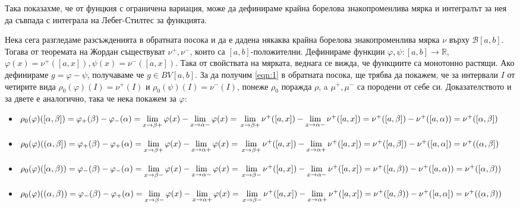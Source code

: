 \documentclass[bulgarian, 12pt]{article}
\begin{document}
Така показахме, че от фунцкия с ограничена вариация, може да дефинираме крайна борелова знакопроменлива мярка и интегралът за нея да съвпада с интеграла на Лебег-Стилтес за функцията. \par
Нека сега разгледаме разсъжденията в обратната посока и да е дадена някаква крайна борелова знакопроменлива мярка $\nu$ върху $\mathcal{B}[a, b]$. Тогава от теоремата на Жордан съществуват $\nu^+, \nu^-$, които са $[a,b]$-положителни. Дефинираме функции $\varphi, \psi : [a, b] \to \mathbb{R}$, $\varphi(x) = \nu^+([a,x]), \psi(x) = \nu^-([a,x])$. Така от свойствата на мярката, веднага се вижда, че функциите са монотонно растящи. Ако дефинираме $g = \varphi - \psi$, получаваме че $g \in BV[a,b]$. За да получим \eqref{eqn:1} в обратната посока, ще трябва да покажем, че за интервали $I$ от четирите вида $\rho_0(\varphi)(I) = \nu^+(I)$ и $\rho_0(\psi)(I) = \nu^-(I)$, понеже $\rho_0$ поражда $\rho$, a $\mu^+, \mu^-$ са породени от себе си. Доказателството и за двете е аналогично, така че нека покажем за $\varphi$:
\begin{itemize}
  \item $\rho_0(\varphi)([\alpha, \beta]) =
    \varphi_+(\beta) - \varphi_-(\alpha) =
    \lim\limits_{x \to \beta+}\varphi(x) - \lim\limits_{x \to \alpha-}\varphi(x) = \\
    \lim\limits_{x \to \beta+}\nu^+([a,x]) - \lim\limits_{x \to \alpha-}\nu^+([a,x]) =
    \nu^+([a, \beta]) - \nu^+([a, \alpha)) =
    \nu^+([\alpha, \beta])$
  \item $\rho_0(\varphi)((\alpha, \beta]) =
    \varphi_+(\beta) - \varphi_+(\alpha) =
    \lim\limits_{x \to \beta+}\varphi(x) - \lim\limits_{x \to \alpha+}\varphi(x) = \\
    \lim\limits_{x \to \beta+}\nu^+([a,x]) - \lim\limits_{x \to \alpha+}\nu^+([a,x]) =
    \nu^+([a, \beta]) - \nu^+([a, \alpha]) =
    \nu^+((\alpha, \beta])$
  \item $\rho_0(\varphi)([\alpha, \beta)) =
    \varphi_-(\beta) - \varphi_-(\alpha) =
    \lim\limits_{x \to \beta-}\varphi(x) - \lim\limits_{x \to \alpha-}\varphi(x) = \\
    \lim\limits_{x \to \beta-}\nu^+([a,x]) - \lim\limits_{x \to \alpha-}\nu^+([a,x]) =
    \nu^+([a, \beta)) - \nu^+([a, \alpha)) =
    \nu^+([\alpha, \beta))$
  \item $\rho_0(\varphi)((\alpha, \beta)) =
    \varphi_-(\beta) - \varphi_+(\alpha) =
    \lim\limits_{x \to \beta-}\varphi(x) - \lim\limits_{x \to \alpha+}\varphi(x) = \\
    \lim\limits_{x \to \beta-}\nu^+([a,x]) - \lim\limits_{x \to \alpha+}\nu^+([a,x]) =
    \nu^+([a, \beta)) - \nu^+([a, \alpha]) =
    \nu^+((\alpha, \beta))$
\end{itemize}
\end{document}
